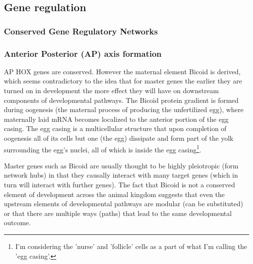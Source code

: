  

\subsection{Gene regulation}

  
\subsubsection{Conserved Gene Regulatory Networks}
\subsubsection*{Anterior Posterior (AP) axis formation}
AP HOX genes are conserved.  However the maternal element Bicoid is derived, which seems contradictory to the idea that for master genes the earlier they are turned on in development the more effect they will have on downstream components of developmental pathways.  The Bicoid protein gradient is formed during oogenesis (the maternal process of producing the unfertilized egg), where maternally laid mRNA becomes localized to the anterior portion of the egg casing.  The egg casing is a multicellular structure that upon completion of oogenesis all of its cells but one (the egg) dissipate and form part of the yolk surrounding the egg's nuclei, all of which is inside the egg casing\footnote{I'm considering the 'nurse' and 'follicle' cells as a part of what I'm calling the 'egg casing'.}.

Master genes such as Bicoid are usually thought to be highly pleiotropic (form network hubs) in that they causally interact with many target genes (which in turn will interact with further genes).  The fact that Bicoid is not a conserved element of development across the animal kingdom suggests that even the upstream elements of developmental pathways are modular (can be substituted) or that there are multiple ways (paths) that lead to the same developmental outcome.

